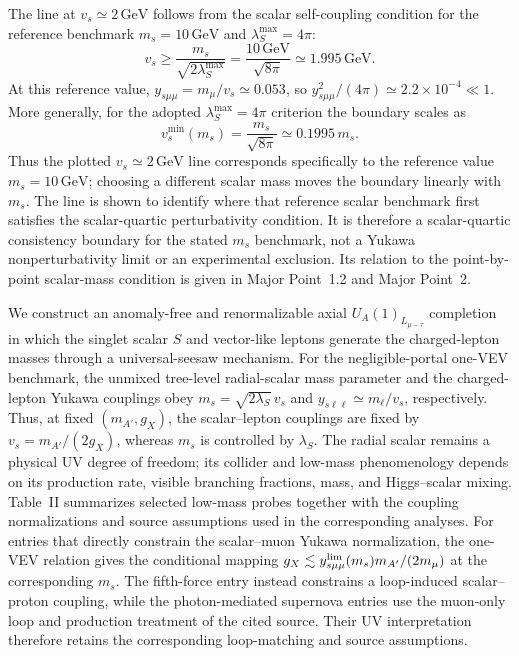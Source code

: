 \documentclass[12pt,a4paper]{article}
\begin{document}
The line at \(v_s\simeq2\,\mathrm{GeV}\) follows from the scalar self-coupling condition for the reference benchmark \(m_s=10\,\mathrm{GeV}\) and \(\lambda_S^{\max}=4\pi\):
\[
v_s\geq\frac{m_s}{\sqrt{2\lambda_S^{\max}}}
=\frac{10\,\mathrm{GeV}}{\sqrt{8\pi}}
\simeq1.995\,\mathrm{GeV}.
\]
At this reference value, \(y_{s\mu\mu}=m_\mu/v_s\simeq0.053\), so \(y_{s\mu\mu}^2/(4\pi)\simeq2.2\times10^{-4}\ll1\). More generally, for the adopted \(\lambda_S^{\max}=4\pi\) criterion the boundary scales as
\[
v_s^{\min}(m_s)=\frac{m_s}{\sqrt{8\pi}}
\simeq0.1995\,m_s.
\]
Thus the plotted \(v_s\simeq2\,\mathrm{GeV}\) line corresponds specifically to the reference value \(m_s=10\,\mathrm{GeV}\); choosing a different scalar mass moves the boundary linearly with \(m_s\). The line is shown to identify where that reference scalar benchmark first satisfies the scalar-quartic perturbativity condition. It is therefore a scalar-quartic consistency boundary for the stated \(m_s\) benchmark, not a Yukawa nonperturbativity limit or an experimental exclusion. Its relation to the point-by-point scalar-mass condition is given in Major Point~1.2 and Major Point~2.

\medskip
{}

We construct an anomaly-free and renormalizable axial \(U_A(1)_{L_{\mu-\tau}}\) completion in which the singlet scalar \(S\) and vector-like leptons generate the charged-lepton masses through a universal-seesaw mechanism. For the negligible-portal one-VEV benchmark, the unmixed tree-level radial-scalar mass parameter and the charged-lepton Yukawa couplings obey \(m_s=\sqrt{2\lambda_S}\,v_s\) and \(y_{s\ell\ell}\simeq m_\ell/v_s\), respectively. Thus, at fixed \((m_{A'},g_X)\), the scalar--lepton couplings are fixed by \(v_s=m_{A'}/(2g_X)\), whereas \(m_s\) is controlled by \(\lambda_S\). The radial scalar remains a physical UV degree of freedom; its collider and low-mass phenomenology depends on its production rate, visible branching fractions, mass, and Higgs--scalar mixing. Table~II summarizes selected low-mass probes together with the coupling normalizations and source assumptions used in the corresponding analyses. For entries that directly constrain the scalar--muon Yukawa normalization, the one-VEV relation gives the conditional mapping \(g_X\lesssim y_{s\mu\mu}^{\rm lim}(m_s)m_{A'}/(2m_\mu)\) at the corresponding \(m_s\). The fifth-force entry instead constrains a loop-induced scalar--proton coupling, while the photon-mediated supernova entries use the muon-only loop and production treatment of the cited source. Their UV interpretation therefore retains the corresponding loop-matching and source assumptions.
\end{document}
